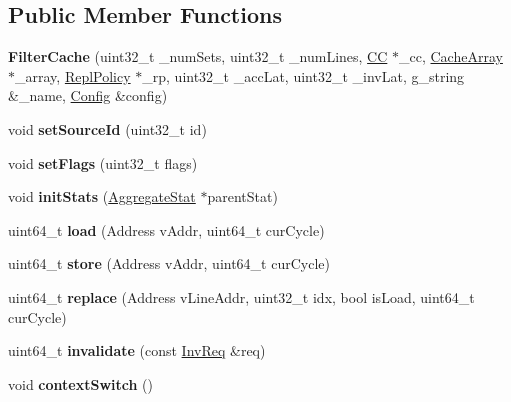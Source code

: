 \subsection*{Public Member Functions}
\begin{DoxyCompactItemize}
\item 
\hypertarget{classFilterCache_a309ef8fa21b08e740d71df61fdcb5768}{{\bfseries Filter\-Cache} (uint32\-\_\-t \-\_\-num\-Sets, uint32\-\_\-t \-\_\-num\-Lines, \hyperlink{classCC}{C\-C} $\ast$\-\_\-cc, \hyperlink{classCacheArray}{Cache\-Array} $\ast$\-\_\-array, \hyperlink{classReplPolicy}{Repl\-Policy} $\ast$\-\_\-rp, uint32\-\_\-t \-\_\-acc\-Lat, uint32\-\_\-t \-\_\-inv\-Lat, g\-\_\-string \&\-\_\-name, \hyperlink{classConfig}{Config} \&config)}\label{classFilterCache_a309ef8fa21b08e740d71df61fdcb5768}

\item 
\hypertarget{classFilterCache_ade026c14eeb800335f9648563da9f6ed}{void {\bfseries set\-Source\-Id} (uint32\-\_\-t id)}\label{classFilterCache_ade026c14eeb800335f9648563da9f6ed}

\item 
\hypertarget{classFilterCache_a31a9f6cfc6b1e0374d1ddc104677a922}{void {\bfseries set\-Flags} (uint32\-\_\-t flags)}\label{classFilterCache_a31a9f6cfc6b1e0374d1ddc104677a922}

\item 
\hypertarget{classFilterCache_a8da6656008a754aad50e3784a2d7a667}{void {\bfseries init\-Stats} (\hyperlink{classAggregateStat}{Aggregate\-Stat} $\ast$parent\-Stat)}\label{classFilterCache_a8da6656008a754aad50e3784a2d7a667}

\item 
\hypertarget{classFilterCache_a1bd3192311a095740da165e296e0bb80}{uint64\-\_\-t {\bfseries load} (Address v\-Addr, uint64\-\_\-t cur\-Cycle)}\label{classFilterCache_a1bd3192311a095740da165e296e0bb80}

\item 
\hypertarget{classFilterCache_a919b949716858aafa3f2942c84aa4212}{uint64\-\_\-t {\bfseries store} (Address v\-Addr, uint64\-\_\-t cur\-Cycle)}\label{classFilterCache_a919b949716858aafa3f2942c84aa4212}

\item 
\hypertarget{classFilterCache_acedfa30e1ab154f2eac586cadc1dd96b}{uint64\-\_\-t {\bfseries replace} (Address v\-Line\-Addr, uint32\-\_\-t idx, bool is\-Load, uint64\-\_\-t cur\-Cycle)}\label{classFilterCache_acedfa30e1ab154f2eac586cadc1dd96b}

\item 
\hypertarget{classFilterCache_abbcca6a956003c482303421aa0638da1}{uint64\-\_\-t {\bfseries invalidate} (const \hyperlink{structInvReq}{Inv\-Req} \&req)}\label{classFilterCache_abbcca6a956003c482303421aa0638da1}

\item 
\hypertarget{classFilterCache_a2ad2ace77694d58bb47cf298963c6cd9}{void {\bfseries context\-Switch} ()}\label{classFilterCache_a2ad2ace77694d58bb47cf298963c6cd9}

\end{DoxyCompactItemize}
